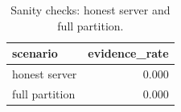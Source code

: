 \begin{table}
\caption{Sanity checks: honest server and full partition.}
\label{tab:sanity-checks}
\begin{tabular}{lr}
\toprule
scenario & evidence_rate \\
\midrule
honest server & 0.000 \\
full partition & 0.000 \\
\bottomrule
\end{tabular}
\end{table}
